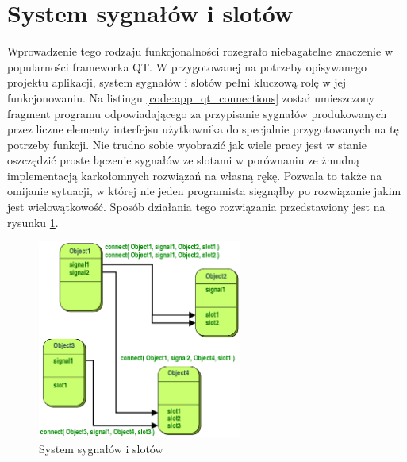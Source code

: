  \section{System sygnałów i slotów}
        Wprowadzenie tego rodzaju funkcjonalności rozegrało niebagatelne znaczenie w popularności frameworka QT. W przygotowanej na potrzeby opisywanego projektu aplikacji, system sygnałów i slotów pełni kluczową rolę w jej funkcjonowaniu. Na listingu \ref{code:app_qt_connections} został umieszczony fragment programu odpowiadającego za przypisanie sygnałów produkowanych przez liczne elementy interfejsu użytkownika do specjalnie przygotowanych na tę potrzeby funkcji. Nie trudno sobie wyobrazić jak wiele pracy jest w stanie oszczędzić proste łączenie sygnałów ze slotami w porównaniu ze żmudną implementacją karkołomnych rozwiązań na własną rękę. Pozwala to także na omijanie sytuacji, w której nie jeden programista sięgnąłby po rozwiązanie jakim jest wielowątkowość. Sposób działania tego rozwiązania przedstawiony jest na rysunku \ref{fig:s&s}.
        
       \begin{figure}[ht]
          \centering
          \includegraphics[width=0.6\textwidth]{img/abstract-connections.png}
          \caption{System sygnałów i slotów \cite{qt_s&s_fig}}
          \label{fig:s&s}
        \end{figure}     
        
        \begin{kod}
          \inputminted[firstline=18, lastline=39]{cpp}{app/listings/mainwindow.cpp}
          \caption{Użycie systemu sygnałów i slotów}
          \label{code:app_qt_connections}
        \end{kod}
        
